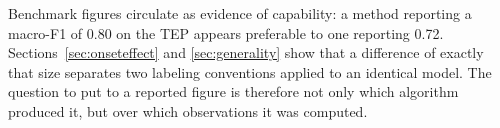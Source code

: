 \documentclass[10pt,twocolumn,a4paper]{article}
\begin{document}
%
%
%
%
%


Benchmark figures circulate as evidence of capability: a method reporting a
macro-F1 of 0.80 on the TEP appears preferable to one reporting 0.72.
Sections~\ref{sec:onseteffect} and \ref{sec:generality} show that a difference
of exactly that size separates two labeling conventions applied to an identical
model. The question to put to a reported figure is therefore not only which
algorithm produced it, but over which observations it was computed.
\end{document}
